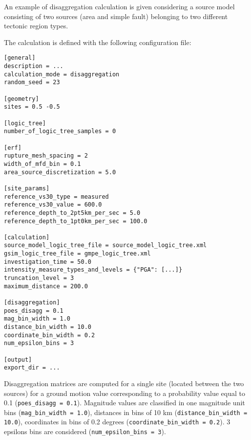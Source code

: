 An example of disaggregation calculation is given considering a source model
consisting of two sources (area and simple fault) belonging to two different
tectonic region types.

The calculation is defined with the following configuration file:

\begin{Verbatim}[frame=single, commandchars=\\\{\}, fontsize=\normalsize]
[general]
description = ...
calculation_mode = disaggregation
random_seed = 23

[geometry]
sites = 0.5 -0.5

[logic_tree]
number_of_logic_tree_samples = 0

[erf]
rupture_mesh_spacing = 2
width_of_mfd_bin = 0.1
area_source_discretization = 5.0

[site_params]
reference_vs30_type = measured
reference_vs30_value = 600.0
reference_depth_to_2pt5km_per_sec = 5.0
reference_depth_to_1pt0km_per_sec = 100.0

[calculation]
source_model_logic_tree_file = source_model_logic_tree.xml
gsim_logic_tree_file = gmpe_logic_tree.xml
investigation_time = 50.0
intensity_measure_types_and_levels = {"PGA": [...]}
truncation_level = 3
maximum_distance = 200.0

[disaggregation]
poes_disagg = 0.1
mag_bin_width = 1.0
distance_bin_width = 10.0
coordinate_bin_width = 0.2
num_epsilon_bins = 3

[output]
export_dir = ...
\end{Verbatim}

Disaggregation matrices are computed for a single site (located between the
two sources) for a ground motion value corresponding to a probability value
equal to 0.1 (\texttt{poes\_\-disagg = 0.1}). Magnitude values are classified
in one magnitude unit bins (\texttt{mag\_\-bin\_\-width = 1.0}), distances in
bins of 10 km (\texttt{distance\_\-bin\_\-width = 10.0}), coordinates in bins
of 0.2 degrees (\texttt{coordinate\_\-bin\_\-width = 0.2}). 3 epsilons bins
are considered (\texttt{num\_\-epsilon\_\-bins = 3}).
